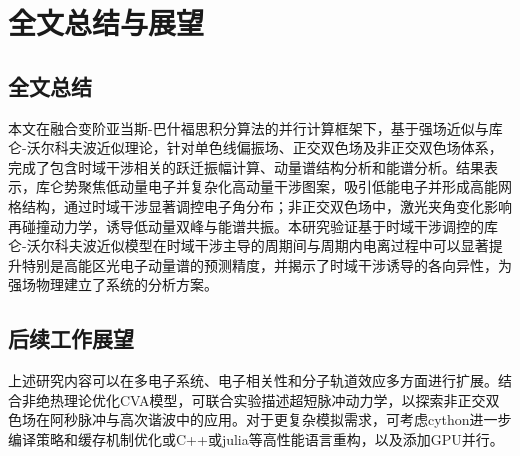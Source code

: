\chapter{全文总结与展望}

\section{全文总结}

本文在融合变阶亚当斯-巴什福思积分算法的并行计算框架下，基于强场近似与库仑-沃尔科夫波近似理论，针对单色线偏振场、正交双色场及非正交双色场体系，完成了包含时域干涉相关的跃迁振幅计算、动量谱结构分析和能谱分析。结果表示，库仑势聚焦低动量电子并复杂化高动量干涉图案，吸引低能电子并形成高能网格结构，通过时域干涉显著调控电子角分布；非正交双色场中，激光夹角变化影响再碰撞动力学，诱导低动量双峰与能谱共振。本研究验证基于时域干涉调控的库仑-沃尔科夫波近似模型在时域干涉主导的周期间与周期内电离过程中可以显著提升特别是高能区光电子动量谱的预测精度，并揭示了时域干涉诱导的各向异性，为强场物理建立了系统的分析方案。

\section{后续工作展望}
上述研究内容可以在多电子系统、电子相关性和分子轨道效应多方面进行扩展。结合非绝热理论优化CVA模型，可联合实验描述超短脉冲动力学，以探索非正交双色场在阿秒脉冲与高次谐波中的应用。对于更复杂模拟需求，可考虑cython进一步编译策略和缓存机制优化或C++或julia等高性能语言重构，以及添加GPU并行。
